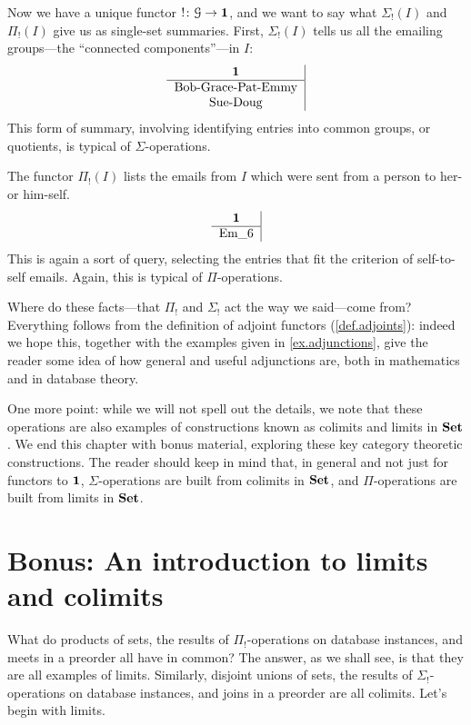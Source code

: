 \documentclass[7Sketches]{subfiles}
\begin{document}
Now we have a unique functor $!\colon\mathcal{G}\to\mathbf{1}$, and we want to say what $\Sigma_!(I)$ and $\Pi_!(I)$ give us as single-set summaries. First, $\Sigma_!(I)$ tells us all the emailing groups---the ``connected components''---in $I$:
\[
\begin{tabular}{ c |}
	\textbf{1}\\\hline
	Bob-Grace-Pat-Emmy\\
	Sue-Doug
\end{tabular}
\]
This form of summary, involving identifying entries into common groups, or
quotients, is typical of $\Sigma$-operations. 

The functor $\Pi_!(I)$ lists the emails from $I$ which were sent from a person to
her- or him-self.
\[
\begin{tabular}{ c |}
	\textbf{1}\\\hline
	Em\_6
\end{tabular}
\]
This is again a sort of query, selecting the entries that fit the criterion of
self-to-self emails. Again, this is typical of $\Pi$-operations.

Where do these facts---that $\Pi_!$ and $\Sigma_!$ act the way we said---come
from? Everything follows from the definition of adjoint functors
(\ref{def.adjoints}): indeed we hope this, together with the examples given in \cref{ex.adjunctions}, give the reader some idea of how general and useful adjunctions are, both in mathematics and in database theory.

One more point: while we will not spell out the details, we note that these
operations are also examples of constructions known as colimits and limits in
$\mathbf{Set}$. We end this chapter with bonus material, exploring these key category theoretic
constructions. The reader should keep in mind that, in general and not just for
functors to $\mathbf{1}$, $\Sigma$-operations are built from colimits in $\mathbf{Set}$,
and $\Pi$-operations are built from limits in $\mathbf{Set}$.

%

\section{Bonus: An introduction to limits and colimits}%
\label{sec.bonus_lims_colims}%

What do products of sets, the results of $\Pi_!$-operations on database instances, and meets in a preorder all have in
common? The answer, as we shall see, is that they are all examples of limits. Similarly, disjoint unions of sets, the results of $\Sigma_!$-operations on database instances, and joins in a preorder are all colimits. Let's begin with limits.%
\end{document}
